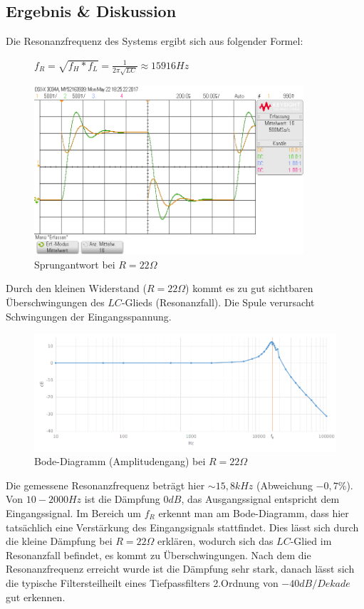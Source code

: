 \documentclass[12pt,a4paper,titlepage]{article}
\begin{document}
\subsection{Ergebnis \& Diskussion}
Die Resonanzfrequenz des Systems ergibt sich aus folgender Formel:
\begin{figure}[H]
  \centering
  $f_R = \sqrt{f_H*f_L} = \frac{1}{2\pi\sqrt{LC}} \approx 15916Hz$
\end{figure}

\begin{figure}[H]
  \centering
  \includegraphics[width=100mm]{sprungantwort_rlc_22.png}
  \caption{Sprungantwort bei $R=22\Omega$}
\end{figure}
\noindent Durch den kleinen Widerstand ($R=22\Omega$) kommt es zu gut sichtbaren \"Uberschwingungen des $LC$-Glieds (Resonanzfall). Die Spule verursacht Schwingungen der Eingangsspannung.

\begin{figure}[H]
  \centering
  \includegraphics[width=150mm]{bode_rlc_22.png}
  \caption{Bode-Diagramm (Amplitudengang) bei $R=22\Omega$}
\end{figure}
\noindent Die gemessene Resonanzfrequenz betr\"agt hier $\sim15,8kHz$ (Abweichung $-0,7\%$). Von $10-2000Hz$ ist die Dämpfung $0dB$, das Ausgangssignal entspricht dem Eingangssignal. Im Bereich um $f_R$ erkennt man am Bode-Diagramm, dass hier tats\"achlich eine Verstärkung des Eingangsignals stattfindet. Dies lässt sich durch die kleine Dämpfung bei $R=22\Omega$ erkl\"aren, wodurch sich das $LC$-Glied im Resonanzfall befindet, es kommt zu \"Uberschwingungen. Nach dem die Resonanzfrequenz erreicht wurde ist die D\"ampfung sehr stark, danach l\"asst sich die typische Filtersteilheilt eines Tiefpassfilters 2.Ordnung von $-40dB/Dekade$ gut erkennen.
\end{document}
